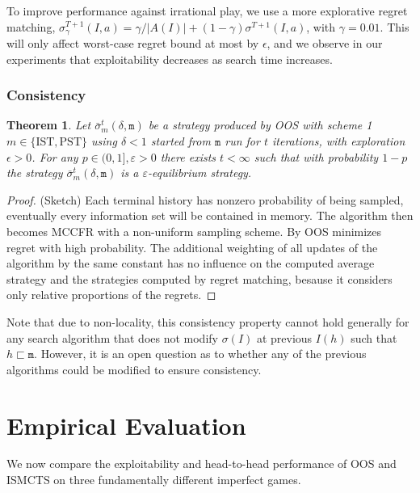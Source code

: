\documentclass{aamas2015}
\newcommand{\ttm}{\mathtt{m}}
\newtheorem{theorem}{Theorem}
\begin{document}
To improve performance against irrational play, we use a more explorative regret matching, 
$\sigma^{T+1}_\gamma(I,a) = \gamma/|A(I)| + (1-\gamma) \sigma^{T+1}(I,a)$, with $\gamma = 0.01$. 
This will only affect worst-case regret bound at most by $\epsilon$, and we observe 
in our experiments that exploitability decreases as search time increases. 


\subsubsection{Consistency}

\begin{theorem}
Let $\bar{\sigma}^t_m(\delta,\ttm)$ be a strategy produced by OOS with scheme 1$m \in \{ \mbox{IST}, \mbox{PST} \}$ 
using $\delta < 1$ started from $\ttm$ run for $t$ iterations, with exploration $\epsilon > 0$.  
For any $p \in (0, 1], \varepsilon > 0$ there exists $t < \infty$ such that with 
probability $1-p$ the strategy  $\bar{\sigma}^t_m(\delta,\ttm)$ is a $\varepsilon$-equilibrium strategy. 
\label{thm:consistency}
\end{theorem}
\begin{proof}(Sketch) Each terminal history has nonzero probability of being sampled, eventually every information 
set will be contained in memory. The algorithm then becomes MCCFR with a non-uniform sampling scheme.
By \cite[Theorem 5]{Lanctot09Sampling} OOS minimizes regret with high probability. The additional weighting of all updates of the algorithm by the same constant has no influence on the computed average strategy and the strategies computed by regret matching, besause it considers only relative proportions of the regrets.
\end{proof}

Note that due to non-locality, this consistency property cannot hold generally for any search 
algorithm that does not modify $\sigma(I)$ at previous $I(h)$ such that $h \sqsubset \ttm$. However, 
it is an open question as to whether any of the previous algorithms could be modified to ensure 
consistency.

\section{Empirical Evaluation}

We now compare the exploitability  and head-to-head performance
of OOS and ISMCTS on three fundamentally different imperfect games. %
\end{document}
